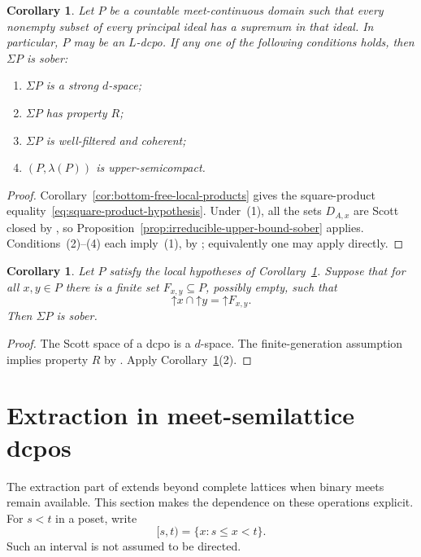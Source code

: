 \documentclass[11pt,reqno]{amsart}
\newtheorem{corollary}[theorem]{Corollary}
\theoremstyle{definition}
\theoremstyle{remark}
\numberwithin{equation}{section}
\newcommand{\up}[1]{\mathord{\uparrow}#1}
\newcommand{\Sig}{\Sigma}
\begin{document}
\begin{corollary}\label{cor:conditional-sobriety}
Let $P$ be a countable meet-continuous domain such that every nonempty subset of every principal ideal has a supremum in that ideal. In particular, $P$ may be an $L$-dcpo. If any one of the following conditions holds, then $\Sig P$ is sober:
\begin{enumerate}[label=\textup{(\arabic*)}]
\item $\Sig P$ is a strong $d$-space;
\item $\Sig P$ has property $R$;
\item $\Sig P$ is well-filtered and coherent;
\item $(P,\lambda(P))$ is upper-semicompact.
\end{enumerate}
\end{corollary}
\begin{proof}
Corollary~\ref{cor:bottom-free-local-products} gives the square-product equality~\eqref{eq:square-product-hypothesis}. Under~(1), all the sets $D_{A,x}$ are Scott closed by \cite[Theorem~61]{LawsonXuLower}, so Proposition~\ref{prop:irreducible-upper-bound-sober} applies. Conditions~(2)--(4) each imply~(1), by \cite[Lemma~50\textup{(3)}, Proposition~33\textup{(2)}, and Proposition~42]{LawsonXuLower}; equivalently one may apply \cite[Theorem~76 and Corollary~77]{LawsonXuLower} directly.
\end{proof}

\begin{corollary}\label{cor:finite-upper-bound-generators}
Let $P$ satisfy the local hypotheses of Corollary~\ref{cor:conditional-sobriety}. Suppose that for all $x,y\in P$ there is a finite set $F_{x,y}\subseteq P$, possibly empty, such that
\[
 \up x\cap\up y=\up F_{x,y}.
\]
Then $\Sig P$ is sober.
\end{corollary}
\begin{proof}
The Scott space of a dcpo is a $d$-space. The finite-generation assumption implies property $R$ by \cite[Proposition~33\textup{(1)}]{LawsonXuLower}. Apply Corollary~\ref{cor:conditional-sobriety}\textup{(2)}.
\end{proof}

\section{Extraction in meet-semilattice dcpos}\label{sec:semilattice}
The extraction part of \cite{XuJi} extends beyond complete lattices when binary meets remain available. This section makes the dependence on these operations explicit. For $s<t$ in a poset, write
\[
 [s,t)=\{x:s\le x<t\}.
\]
Such an interval is not assumed to be directed.
\end{document}
